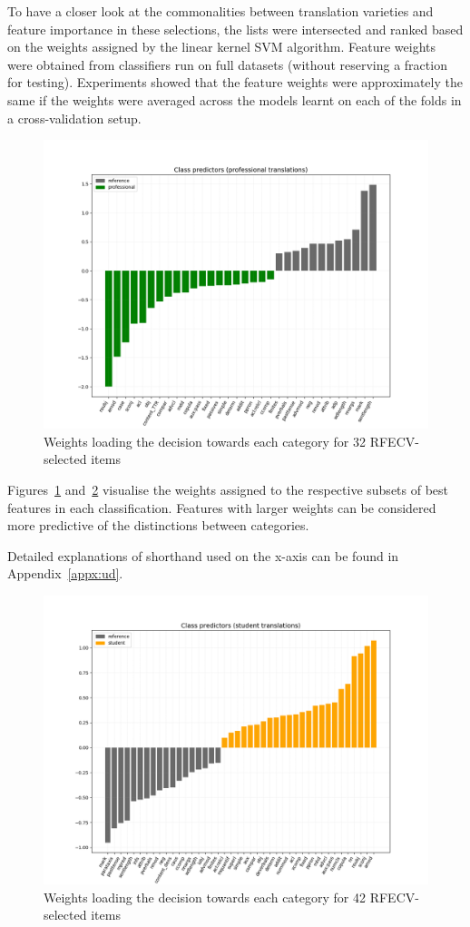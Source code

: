 To have a closer look at the commonalities between translation varieties and feature importance in these selections, the lists were intersected and ranked based on the weights assigned by the linear kernel SVM algorithm. Feature weights were obtained from classifiers run on full datasets (without reserving a fraction for testing). Experiments showed that the feature weights were approximately the same if the weights were averaged across the models learnt on each of the folds in a cross-validation setup.

\vspace{-2em}
\begin{figure}[H]
	\centering
	\includegraphics[width=.85\linewidth]{figures/pro-ref-bars-ud33}
	\caption{\label{fig:pro-weights}Weights loading the decision towards each category for 32 RFECV-selected items}	
\end{figure}

Figures~\ref{fig:pro-weights} and~\ref{fig:stu-weights} visualise the weights assigned to the respective subsets of best features in each classification. Features with larger weights can be considered more predictive of the distinctions between categories. 

Detailed explanations of shorthand used on the x-axis can be found in Appendix~\ref{appx:ud}.

\vspace{-2em}
\begin{figure}[H]
	\centering
	\includegraphics[width=.85\linewidth]{figures/stu-ref-bars-ud42}
	\caption{\label{fig:stu-weights}Weights loading the decision towards each category for 42 RFECV-selected items}	
\end{figure}

